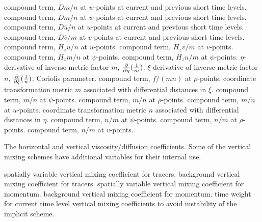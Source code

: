 \begin{klist}
\begin{klist}
            compound term, $Dm/n$ at $\psi$-points at
    current and previous short time levels.
            compound term, $Dm/n$ at $\psi$-points at
    current and previous short time levels.
            compound term, $D\overline{u}/n$ at
    $u$-points at current and previous short time levels.
            compound term, $D\overline{v}/m$ at
    $v$-points at current and previous short time levels.
            compound term, $H_zu/n$ at $u$-points.
            compound term, $H_zv/m$ at $v$-points.
           compound term, $H_zm/n$ at $\psi$-points.
           compound term, $H_zn/m$ at $\psi$-points.
              $\eta$-derivative of inverse metric factor
    $m$, ${\partial \over \partial\eta}({1 \over m})$.
              $\xi$-derivative  of inverse metric factor
    $n$, ${\partial \over \partial\xi}({1 \over n})$.
                 Coriolis parameter.
              compound term, $f/(mn)$ at $\rho$-points.
                coordinate transformation metric $m$
    associated with differential distances in $\xi$.
            compound term, $m/n$ at $\psi$-points.
            compound term, $m/n$ at $\rho$-points.
            compound term, $m/n$ at $u$-points.
                coordinate transformation metric $n$
    associated with differential distances in $\eta$.
            compound term, $n/m$ at $\psi$-points.
            compound term, $n/m$ at $\rho$-points.
            compound term, $n/m$ at $v$-points.
    \end{klist}
   The horizontal and vertical viscosity/diffusion
  coefficients.  Some of the vertical mixing schemes have additional
  variables for their internal use.
    \begin{klist}
               spatially variable vertical mixing
    coefficient for tracers.
           background vertical mixing coefficient for
    tracers.
               spatially variable vertical mixing
    coefficient for momentum.
           background vertical mixing coefficient for
   momentum.
               time weight for current time level vertical
    mixing coefficients to avoid instability of the implicit scheme.

\end{klist}
\end{klist}

